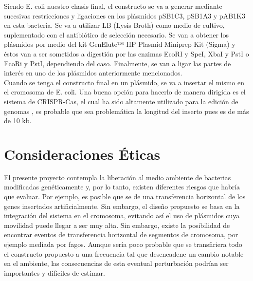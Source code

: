 \documentclass[12pt]{article}
\begin{document}
Siendo E. coli nuestro chasis final, el constructo se va a generar mediante sucesivas restricciones y ligaciones en los plásmidos pSB1C3, pSB1A3 y pAB1K3 \cite{igem} en esta bacteria. Se va a utilizar LB (Lysis Broth) como medio de cultivo, suplementado con el antibiótico de selección necesario. Se van a obtener los plásmidos por medio del kit GenElute™ HP Plasmid Miniprep Kit (Sigma) y éstos van a ser sometidos a digestión por las enzimas EcoRI y SpeI, XbaI y PstI o EcoRi y PstI, dependiendo del caso. Finalmente, se van a ligar las partes de interés en uno de los plásmidos anteriormente mencionados.\\

Cuando se tenga el constructo final en un plásmido, se va a insertar el mismo en el cromosoma de E. coli. Una buena opción para hacerlo de manera dirigida es el sistema de CRISPR-Cas, el cual ha sido altamente utilizado para la edición de genomas \cite{xie13}, es probable que sea problemática la longitud del inserto pues es de m\'as de 10 kb.

\section{Consideraciones \'Eticas}

El presente proyecto contempla la liberación al medio ambiente de bacterias modificadas genéticamente y, por lo tanto, existen diferentes riesgos que habría que evaluar. Por ejemplo, es posible que se de una transferencia horizontal de los genes insertados artificialmente. Sin embargo, el diseño propuesto se basa en la integración del sistema en el cromosoma, evitando así el uso de plásmidos cuya movilidad puede llegar a ser muy alta. Sin embargo, existe la posibilidad de encontrar eventos de transferencia horizontal de segmentos de cromosoma, por ejemplo mediada por fagos. Aunque sería poco probable que se transfiriera todo el constructo propuesto a una frecuencia tal que desencadene un cambio notable en el ambiente, las consecuencias de esta eventual perturbación podrían ser importantes y difíciles de estimar.\\
\end{document}
